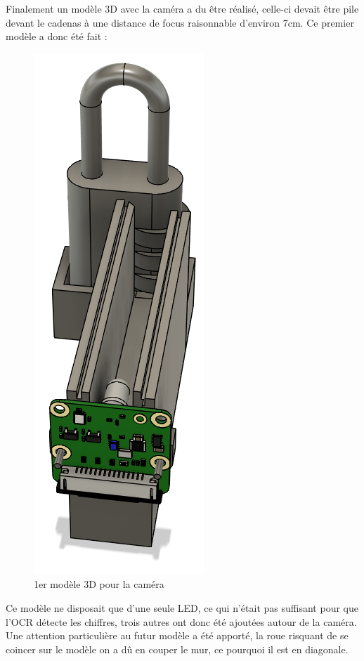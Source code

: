 \documentclass[twoside]{article}
\begin{document}
\begin{multicols}{2}
Finalement un modèle 3D avec la caméra a du être réalisé, celle-ci devait être pile devant le cadenas à une distance de focus raisonnable d'environ 7cm. Ce premier modèle a donc été fait :

\begin{figure}[H]
\centering
\includegraphics[scale=0.7]{cameralocker1ststruct.png}
\caption{1er modèle 3D pour la caméra}
\end{figure}

Ce modèle ne disposait que d'une seule LED, ce qui n'était pas suffisant pour que l'OCR détecte les chiffres, trois autres ont donc été ajoutées autour de la caméra. Une attention particulière au futur modèle a été apporté, la roue risquant de se coincer sur le modèle on a dû en couper le mur, ce pourquoi il est en diagonale.


\end{multicols}
\end{document}
